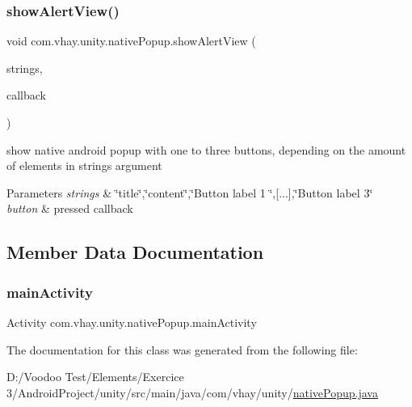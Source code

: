 \subsubsection{\texorpdfstring{show\+Alert\+View()}{showAlertView()}}
{\footnotesize\ttfamily void com.\+vhay.\+unity.\+native\+Popup.\+show\+Alert\+View (\begin{DoxyParamCaption}\item[{String \mbox{[}$\,$\mbox{]}}]{strings,  }\item[{final \mbox{\hyperlink{interfacecom_1_1vhay_1_1unity_1_1native_popup_1_1_alert_view_callback}{Alert\+View\+Callback}}}]{callback }\end{DoxyParamCaption})}



show native android popup with one to three buttons, depending on the amount of elements in strings argument 


\begin{DoxyParams}{Parameters}
{\em strings} & \char`\"{}title\char`\"{},\char`\"{}content\char`\"{},\char`\"{}\+Button label 1 \char`\"{},\mbox{[}...\mbox{]},\char`\"{}\+Button label 3\char`\"{} \\
\hline
{\em button} & pressed callback \\
\hline
\end{DoxyParams}


\subsection{Member Data Documentation}
\mbox{\label{classcom_1_1vhay_1_1unity_1_1native_popup_a719bd6ea2a582ea5a85cb896abcef72e}} 
\subsubsection{\texorpdfstring{main\+Activity}{mainActivity}}
{\footnotesize\ttfamily Activity com.\+vhay.\+unity.\+native\+Popup.\+main\+Activity\hspace{0.3cm}{\ttfamily [static]}}



The documentation for this class was generated from the following file\+:\begin{DoxyCompactItemize}
\item 
D\+:/\+Voodoo Test/\+Elements/\+Exercice 3/\+Android\+Project/unity/src/main/java/com/vhay/unity/\mbox{\hyperlink{native_popup_8java}{native\+Popup.\+java}}\end{DoxyCompactItemize}
